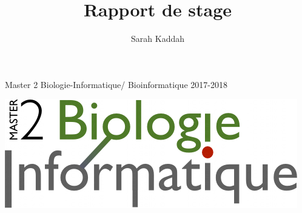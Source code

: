 \documentclass[12pt,a4paper]{article}
\author{Sarah Kaddah}
\title{Rapport de stage}
\begin{document}
\begin{titlepage}
  \begin{sffamily}
  \begin{center}
	\large{Master 2 Biologie-Informatique/ Bioinformatique \hfill 2017-2018}
	\begin{center}
		\includegraphics[scale=0.3]{img/m2.png} \hfill

\end{center}
\end{center}
\end{sffamily}
\end{titlepage}
\end{document}
